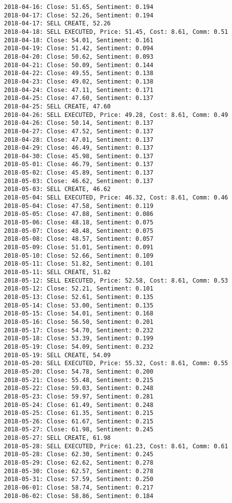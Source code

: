 \documentclass[11pt]{article}
\begin{document}
\begin{Verbatim}[commandchars=\\\{\}]
2018-04-16: Close: 51.65, Sentiment: 0.194
2018-04-17: Close: 52.26, Sentiment: 0.194
2018-04-17: SELL CREATE, 52.26
2018-04-18: SELL EXECUTED, Price: 51.45, Cost: 8.61, Comm: 0.51
2018-04-18: Close: 54.01, Sentiment: 0.161
2018-04-19: Close: 51.42, Sentiment: 0.094
2018-04-20: Close: 50.62, Sentiment: 0.093
2018-04-21: Close: 50.09, Sentiment: 0.144
2018-04-22: Close: 49.55, Sentiment: 0.138
2018-04-23: Close: 49.02, Sentiment: 0.138
2018-04-24: Close: 47.11, Sentiment: 0.171
2018-04-25: Close: 47.60, Sentiment: 0.137
2018-04-25: SELL CREATE, 47.60
2018-04-26: SELL EXECUTED, Price: 49.28, Cost: 8.61, Comm: 0.49
2018-04-26: Close: 50.14, Sentiment: 0.137
2018-04-27: Close: 47.52, Sentiment: 0.137
2018-04-28: Close: 47.01, Sentiment: 0.137
2018-04-29: Close: 46.49, Sentiment: 0.137
2018-04-30: Close: 45.98, Sentiment: 0.137
2018-05-01: Close: 46.79, Sentiment: 0.137
2018-05-02: Close: 45.89, Sentiment: 0.137
2018-05-03: Close: 46.62, Sentiment: 0.137
2018-05-03: SELL CREATE, 46.62
2018-05-04: SELL EXECUTED, Price: 46.32, Cost: 8.61, Comm: 0.46
2018-05-04: Close: 47.58, Sentiment: 0.119
2018-05-05: Close: 47.88, Sentiment: 0.086
2018-05-06: Close: 48.18, Sentiment: 0.075
2018-05-07: Close: 48.48, Sentiment: 0.075
2018-05-08: Close: 48.57, Sentiment: 0.057
2018-05-09: Close: 51.01, Sentiment: 0.091
2018-05-10: Close: 52.66, Sentiment: 0.109
2018-05-11: Close: 51.82, Sentiment: 0.101
2018-05-11: SELL CREATE, 51.82
2018-05-12: SELL EXECUTED, Price: 52.58, Cost: 8.61, Comm: 0.53
2018-05-12: Close: 52.21, Sentiment: 0.101
2018-05-13: Close: 52.61, Sentiment: 0.135
2018-05-14: Close: 53.00, Sentiment: 0.135
2018-05-15: Close: 54.01, Sentiment: 0.168
2018-05-16: Close: 56.50, Sentiment: 0.201
2018-05-17: Close: 54.70, Sentiment: 0.232
2018-05-18: Close: 53.39, Sentiment: 0.199
2018-05-19: Close: 54.09, Sentiment: 0.232
2018-05-19: SELL CREATE, 54.09
2018-05-20: SELL EXECUTED, Price: 55.32, Cost: 8.61, Comm: 0.55
2018-05-20: Close: 54.78, Sentiment: 0.200
2018-05-21: Close: 55.48, Sentiment: 0.215
2018-05-22: Close: 59.03, Sentiment: 0.248
2018-05-23: Close: 59.97, Sentiment: 0.281
2018-05-24: Close: 61.49, Sentiment: 0.248
2018-05-25: Close: 61.35, Sentiment: 0.215
2018-05-26: Close: 61.67, Sentiment: 0.215
2018-05-27: Close: 61.98, Sentiment: 0.245
2018-05-27: SELL CREATE, 61.98
2018-05-28: SELL EXECUTED, Price: 61.23, Cost: 8.61, Comm: 0.61
2018-05-28: Close: 62.30, Sentiment: 0.245
2018-05-29: Close: 62.62, Sentiment: 0.278
2018-05-30: Close: 62.57, Sentiment: 0.278
2018-05-31: Close: 57.59, Sentiment: 0.250
2018-06-01: Close: 58.74, Sentiment: 0.217
2018-06-02: Close: 58.86, Sentiment: 0.184

\end{Verbatim}
\end{document}

